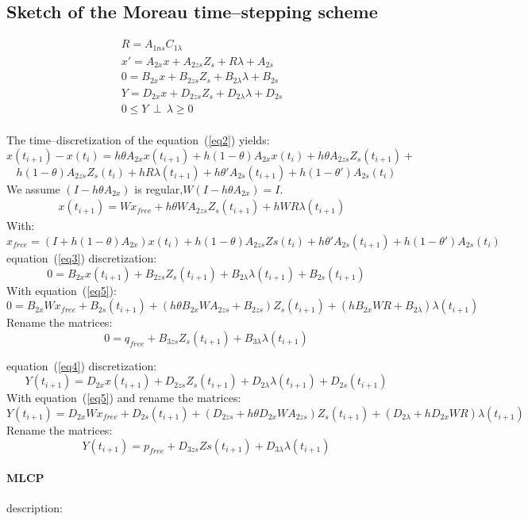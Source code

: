 \subsection{Sketch of  the Moreau time--stepping scheme}
\begin{eqnarray}
R=A_{1ns}C_{1\lambda}\label{eq1}\\
x'=A_{2x}x +A_{2zs}Z_{s} +R \lambda +A_{2s}&\label{eq2}\\
0=B_{2x}x+B_{2zs}Z_{s} + B_{2\lambda}\lambda + B_{2s}&\label{eq3}\\
Y=D_{2x}x+D_{2zs}Z_{s}+D_{2\lambda}\lambda + D_{2s} &\label{eq4}\\
0 \leq Y \, \perp \, \lambda \geq 0&\label{eqperp}\\
\end{eqnarray}


 The time--discretization of the equation~(\ref{eq2}) yields:
\[x(t_{i+1}) - x(t_{i})=h\theta A_{2x}x(t_{i+1})+h(1-\theta)A_{2x}x(t_{i}) +h\theta
A_{2zs}Z_{s}(t_{i+1}) +\]
\[h(1-\theta)A_{2zs}Z_s(t_{i}) +hR\lambda (t_{i+1}) + h\theta 'A_{2s}(t_{i+1}) +
h(1-\theta ')A_{2s}(t_{i})\]
We assume $(I-h\theta A_{2x})$ is regular,$W(I-h\theta A_{2x}) = I.$
\begin{eqnarray}
x(t_{i+1})=Wx_{free}+h\theta WA_{2zs}Z_{s}(t_{i+1})+hWR\lambda (t_{i+1}) &\label{eq5}
\end{eqnarray}
With:
\[x_{free}=(I+h(1-\theta)A_{2x})x(t_{i}) + h(1-\theta )A_{2zs}Zs(t_{i}) + h\theta 'A_{2s}(t_{i+1}) +
h(1-\theta ')A_{2s}(t_{i})\]
equation~(\ref{eq3}) discretization:
\[0 = B_{2x}x(t_{i+1})+B_{2zs}Z_{s}(t_{i+1}) + B_{2\lambda}\lambda(t_{i+1})+B_{2s}(t_{i+1})\]
With equation~(\ref{eq5}):
\[0 = B_{2x}Wx_{free}+B_{2s}(t_{i+1})+(h\theta B_{2x} WA_{2zs}+B_{2zs}) Z_{s}(t_{i+1})+(hB_{2x}WR+B_{2\lambda})\lambda(t_{i+1})\]
Rename the matrices:
\[0 = q_{free}+B_{3zs} Z_{s}(t_{i+1})+B_{3\lambda}\lambda(t_{i+1})\]

equation~(\ref{eq4}) discretization:
\[Y(t_{i+1})=D_{2x}x(t_{i+1})+D_{2zs}Z_{s}(t_{i+1}) +D_{2\lambda}\lambda(t_{i+1})+D_{2s}(t_{i+1})\]
With equation~(\ref{eq5}) and rename the matrices:
\[Y(t_{i+1})=D_{2x}Wx_{free}+ D_{2s}(t_{i+1})+(D_{2zs}+h\theta
D_{2x}WA_{2zs})Z_{s}(t_{i+1})+(D_{2\lambda} + hD_{2x}WR)\lambda(t_{i+1})\]
Rename the matrices:
\[Y(t_{i+1})=p_{free}+D_{3zs}Zs(t_{i+1}) +D_{3\lambda}\lambda (t_{i+1})\]

\paragraph{MLCP}
description:\\

